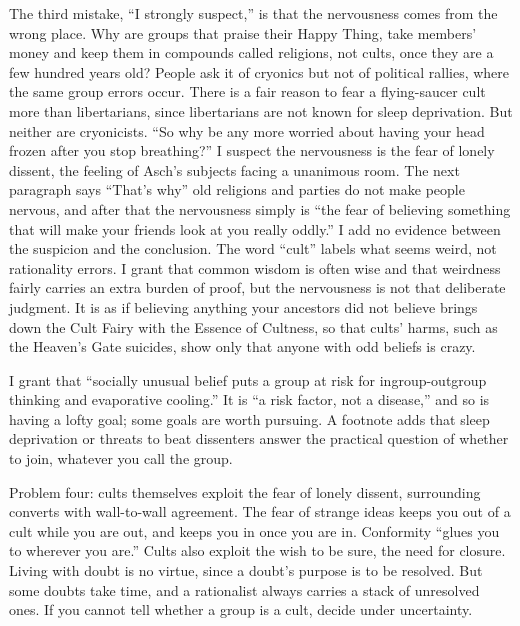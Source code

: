 The third mistake, ``I strongly suspect,'' is that the nervousness comes from the wrong place. Why are groups that praise their Happy Thing, take members' money and keep them in compounds called religions, not cults, once they are a few hundred years old? People ask it of cryonics but not of political rallies, where the same group errors occur. There is a fair reason to fear a flying-saucer cult more than libertarians, since libertarians are not known for sleep deprivation. But neither are cryonicists. ``So why be any more worried about having your head frozen after you stop breathing?''  I suspect the nervousness is the fear of lonely dissent, the feeling of Asch's subjects facing a unanimous room. The next paragraph says ``That's why'' old religions and parties do not make people nervous, and after that the nervousness simply is ``the fear of believing something that will make your friends look at you really oddly.'' I add no evidence between the suspicion and the conclusion. The word ``cult'' labels what seems weird, not rationality errors. I grant that common wisdom is often wise and that weirdness fairly carries an extra burden of proof, but the nervousness is not that deliberate judgment. It is as if believing anything your ancestors did not believe brings down the Cult Fairy with the Essence of Cultness, so that cults' harms, such as the Heaven's Gate suicides, show only that anyone with odd beliefs is crazy.

I grant that ``socially unusual belief puts a group at risk for ingroup-outgroup thinking and evaporative cooling.'' It is ``a risk factor, not a disease,'' and so is having a lofty goal; some goals are worth pursuing. A footnote adds that sleep deprivation or threats to beat dissenters answer the practical question of whether to join, whatever you call the group.

Problem four: cults themselves exploit the fear of lonely dissent, surrounding converts with wall-to-wall agreement. The fear of strange ideas keeps you out of a cult while you are out, and keeps you in once you are in. Conformity ``glues you to wherever you are.'' Cults also exploit the wish to be sure, the need for closure. Living with doubt is no virtue, since a doubt's purpose is to be resolved. But some doubts take time, and a rationalist always carries a stack of unresolved ones. If you cannot tell whether a group is a cult, decide under uncertainty.

